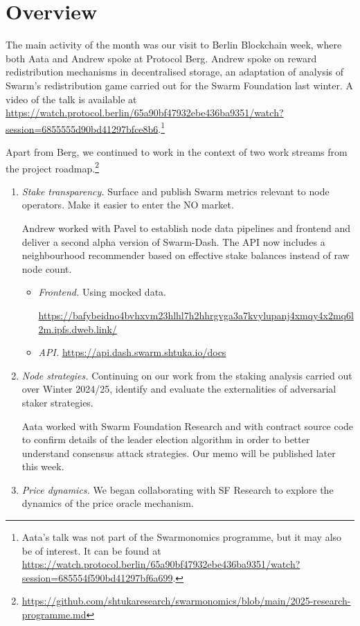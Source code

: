 \maketitle
\section*{Overview}

The main activity of the month was our visit to Berlin Blockchain week, where both Aata and Andrew spoke at Protocol Berg.
%
Andrew spoke on reward redistribution mechanisms in decentralised storage, an adaptation of analysis of Swarm's redistribution game carried out for the Swarm Foundation last winter.
%
A video of the talk is available at \url{https://watch.protocol.berlin/65a90bf47932ebe436ba9351/watch?session=6855555d90bd41297bfce8b6}.\footnote{Aata's talk was not part of the Swarmonomics programme, but it may also be of interest. It can be found at \url{https://watch.protocol.berlin/65a90bf47932ebe436ba9351/watch?session=685554f590bd41297bf6a699}.}

Apart from Berg, we continued to work in the context of two work streams from the project roadmap.\footnote{\url{https://github.com/shtukaresearch/swarmonomics/blob/main/2025-research-programme.md}}

\begin{enumerate}
\item \emph{Stake transparency.} Surface and publish Swarm metrics relevant to node operators. Make it easier to enter the NO market.

Andrew worked with Pavel to establish node data pipelines and frontend and deliver a second alpha version of Swarm-Dash.
%
The API now includes a neighbourhood recommender based on effective stake balances instead of raw node count.

\begin{itemize}
  \item \emph{Frontend.} Using mocked data. 
  
  {\small \url{https://bafybeidno4bvhxvm23hlhl7h2hhrgvga3a7kvylupanj4xmqy4x2mq6l2m.ipfs.dweb.link/}}
  \item \emph{API.} \url{https://api.dash.swarm.shtuka.io/docs}
\end{itemize}

\item \emph{Node strategies.}  Continuing on our work from the staking analysis carried out over Winter 2024/25, identify and evaluate the externalities of adversarial staker strategies.

Aata worked with Swarm Foundation Research and with contract source code to confirm details of the leader election algorithm in order to better understand consensus attack strategies. 
%
Our memo will be published later this week.

\item \emph{Price dynamics.} We began collaborating with SF Research to explore the dynamics of the price oracle mechanism.

\end{enumerate}
